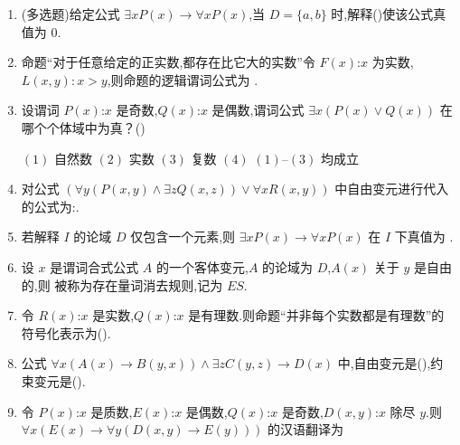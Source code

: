 \begin{enumerate}
	\item (多选题)给定公式 \(\exists xP(x)\to \forall xP(x)\),当 \(D=\{a,b\}\) 时,解释(\quad)使该公式真值为 \(0\).
	
	
	\item 命题“对于任意给定的正实数,都存在比它大的实数”令 \(F(x)\):\(x\) 为实数,\(L(x,y):x>y\),则命题的逻辑谓词公式为 \underline{\hspace{8cm}}.
	
	\item 设谓词 \(P(x)\):\(x\) 是奇数,\(Q(x)\):\(x\) 是偶数,谓词公式 \(\exists x(P(x)\vee Q(x))\) 在哪个个体域中为真？(\quad)
	
	\((1)\) 自然数 \quad \((2)\) 实数 \quad \((3)\) 复数 \quad \((4)\) \((1)\)--\((3)\) 均成立
	
	
	\item 对公式 \((\forall y(P(x,y)\land \exists zQ(x,z))\vee \forall xR(x,y))\) 中自由变元进行代入的公式为:\underline{\hspace{1cm}}.
	
	\item 若解释 \(I\) 的论域 \(D\) 仅包含一个元素,则 \(\exists xP(x)\to \forall xP(x)\) 在 \(I\) 下真值为 \underline{\hspace{6cm}}.
	
	\item 设 \(x\) 是谓词合式公式 \(A\) 的一个客体变元,\(A\) 的论域为 \(D\),\(A(x)\) 关于 \(y\) 是自由的,则 \underline{\hspace{6cm}} 被称为存在量词消去规则,记为 \(ES\).
	
	\item 令 \(R(x)\):\(x\) 是实数,\(Q(x)\):\(x\) 是有理数.则命题“并非每个实数都是有理数”的符号化表示为(\quad).
	
	
	
	\item 公式 \(\forall x(A(x)\to B(y,x))\land \exists zC(y,z)\to D(x)\) 中,自由变元是(\quad),约束变元是(\quad).
	
	
	
	\item 令 \(P(x)\):\(x\) 是质数,\(E(x)\):\(x\) 是偶数,\(Q(x)\):\(x\) 是奇数,\(D(x,y)\):\(x\) 除尽 \(y\).则 \(\forall x(E(x)\to \forall y(D(x,y)\to E(y)))\) 的汉语翻译为
	

\end{enumerate}
